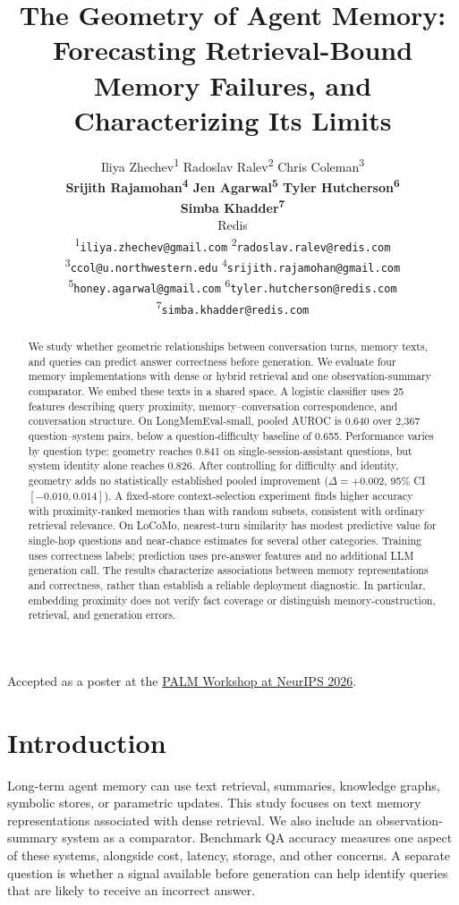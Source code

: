\documentclass{article}
\title{The Geometry of Agent Memory:\\ Forecasting Retrieval-Bound Memory
Failures, and Characterizing Its Limits}
\author{%
  Iliya Zhechev\textsuperscript{1} \quad Radoslav Ralev\textsuperscript{2} \quad Chris Coleman\textsuperscript{3}\\
  \textbf{Srijith Rajamohan\textsuperscript{4} \quad Jen Agarwal\textsuperscript{5} \quad Tyler Hutcherson\textsuperscript{6}}\\
  \textbf{Simba Khadder\textsuperscript{7}}\\
  Redis\\
  {\small\textsuperscript{1}\texttt{iliya.zhechev@gmail.com}\quad
    \textsuperscript{2}\texttt{radoslav.ralev@redis.com}}\\
  {\small\textsuperscript{3}\texttt{ccol@u.northwestern.edu}\quad
    \textsuperscript{4}\texttt{srijith.rajamohan@gmail.com}}\\
  {\small\textsuperscript{5}\texttt{honey.agarwal@gmail.com}\quad
    \textsuperscript{6}\texttt{tyler.hutcherson@redis.com}}\\
  {\small\textsuperscript{7}\texttt{simba.khadder@redis.com}}
}
\begin{document}
\maketitle

\begin{center}
  \small Accepted as a poster at the
  \href{https://openreview.net/forum?id=xP0xvmQZhB}{PALM Workshop at NeurIPS 2026}.
\end{center}

\begin{abstract}
We study whether geometric relationships between conversation turns, memory
texts, and queries can predict answer correctness before generation.
We evaluate four memory implementations with dense or hybrid retrieval and one
observation-summary comparator. We embed these texts in a shared space.
A logistic classifier
uses 25 features describing query proximity, memory--conversation
correspondence, and conversation structure.
On LongMemEval-small, pooled AUROC is 0.640 over 2{,}367 question--system pairs,
below a question-difficulty baseline of 0.655. Performance varies by question
type: geometry reaches 0.841 on single-session-assistant questions, but system
identity alone reaches 0.826. After controlling for difficulty and identity,
geometry adds no statistically established pooled improvement
($\Delta=+0.002$, 95\% CI $[-0.010,0.014]$).
A fixed-store context-selection experiment finds higher accuracy with
proximity-ranked memories than with random subsets, consistent with ordinary
retrieval relevance. On LoCoMo, nearest-turn similarity has modest predictive
value for single-hop questions and near-chance estimates for several other
categories. Training uses correctness labels; prediction uses pre-answer
features and no additional LLM generation call.
The results characterize associations between memory representations and
correctness, rather than establish a reliable deployment diagnostic.
In particular, embedding proximity does not verify fact coverage or distinguish
memory-construction, retrieval, and generation errors.
\end{abstract}

\section{Introduction}

Long-term agent memory can use text retrieval, summaries, knowledge graphs,
symbolic stores, or parametric updates. This study focuses on text memory
representations associated with dense retrieval. We also include an
observation-summary system as a comparator. Benchmark QA accuracy measures one
aspect of these systems, alongside cost, latency, storage, and other concerns.
A separate question is whether a signal available before generation can help
identify queries that are likely to receive an incorrect answer.
\end{document}
